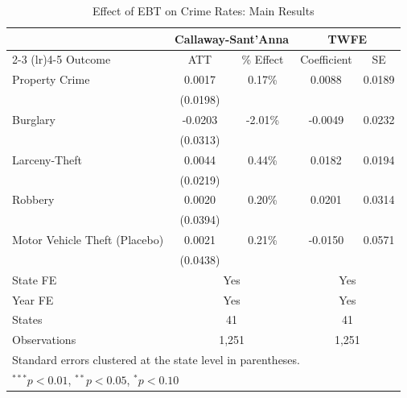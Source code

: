 \begin{table}[htbp]
\centering
\caption{Effect of EBT on Crime Rates: Main Results}
\label{tab:main_results}
\begin{tabular}{lcccc}
\toprule
 & \multicolumn{2}{c}{Callaway-Sant'Anna} & \multicolumn{2}{c}{TWFE} \\
\cmidrule(lr){2-3} \cmidrule(lr){4-5}
Outcome & ATT & \% Effect & Coefficient & SE \\
\midrule
Property Crime & 0.0017 & 0.17\% & 0.0088 & 0.0189 \\
 & (0.0198) & & & \\
Burglary & -0.0203 & -2.01\% & -0.0049 & 0.0232 \\
 & (0.0313) & & & \\
Larceny-Theft & 0.0044 & 0.44\% & 0.0182 & 0.0194 \\
 & (0.0219) & & & \\
Robbery & 0.0020 & 0.20\% & 0.0201 & 0.0314 \\
 & (0.0394) & & & \\
Motor Vehicle Theft (Placebo) & 0.0021 & 0.21\% & -0.0150 & 0.0571 \\
 & (0.0438) & & & \\
\midrule
State FE & \multicolumn{2}{c}{Yes} & \multicolumn{2}{c}{Yes} \\
Year FE & \multicolumn{2}{c}{Yes} & \multicolumn{2}{c}{Yes} \\
States & \multicolumn{2}{c}{41} & \multicolumn{2}{c}{41} \\
Observations & \multicolumn{2}{c}{1,251} & \multicolumn{2}{c}{1,251} \\
\bottomrule
\multicolumn{5}{l}{\footnotesize Standard errors clustered at the state level in parentheses.} \\
\multicolumn{5}{l}{\footnotesize $^{***}p<0.01$, $^{**}p<0.05$, $^{*}p<0.10$} \\
\end{tabular}
\end{table}
